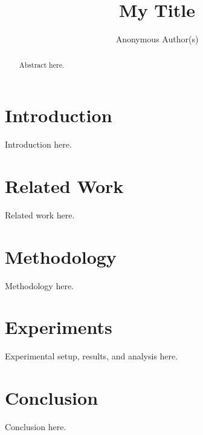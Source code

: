 \documentclass[sigconf,review,anonymous]{acmart}
\begin{document}
\title{My Title}

\author{Anonymous Author(s)}

\begin{abstract}
Abstract here.
\end{abstract}


\maketitle


\section{Introduction}
\label{sec:intro}
Introduction here.

\section{Related Work}
\label{sec:related_work}
Related work here.

\section{Methodology}
\label{sec:method}
Methodology here.

\section{Experiments}
\label{sec:experiments}
Experimental setup, results, and analysis here.

\section{Conclusion}
\label{sec:conclusion}
Conclusion here.




\end{document}
